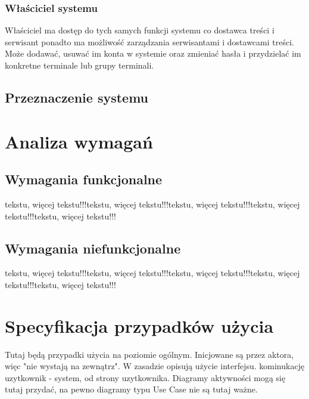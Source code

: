 \documentclass[a4paper,titlepage,twoside,openright]{report} %
\begin{document}
			\subsection{Właściciel systemu}
				Właściciel ma dostęp do tych samych funkcji systemu co dostawca treści i serwisant ponadto ma możliwość zarządzania serwisantami i dostawcami treści. Może dodawać, usuwać im konta w systemie oraz zmieniać hasła i przydzielać im konkretne terminale lub grupy terminali.
		\section{Przeznaczenie systemu}

	\chapter{Analiza wymagań}
		\section{Wymagania funkcjonalne}
		    tekstu, więcej tekstu!!!tekstu, więcej tekstu!!!tekstu, więcej tekstu!!!tekstu, więcej tekstu!!!tekstu, więcej tekstu!!!
		\section{Wymagania niefunkcjonalne}
		    tekstu, więcej tekstu!!!tekstu, więcej tekstu!!!tekstu, więcej tekstu!!!tekstu, więcej tekstu!!!tekstu, więcej tekstu!!!
	
	\chapter{Specyfikacja przypadków użycia}	
	
		Tutaj będą przypadki użycia na poziomie ogólnym. Inicjowane są przez aktora, więc "nie wystają na zewnątrz". W zasadzie opisują użycie interfejsu. kominukację uzytkownik - system, od strony uzytkownika.\newline
		Diagramy aktywności mogą się tutaj przydać, na pewno diagramy typu Use Case nie są tutaj ważne.\newline
\end{document}
